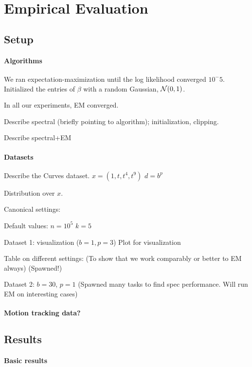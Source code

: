 \section{Empirical Evaluation}
\label{sec:evaluation}

\subsection{Setup}

\paragraph{Algorithms}

We ran expectation-maximization until the log likelihood converged
$10^-5$. Initialized the entries of $\beta$ with a random Gaussian, $\mathcal{N}(0, 1)$.

In all our experiments, EM converged.

Describe spectral (briefly pointing to algorithm);
initialization, clipping.

Describe spectral+EM

\paragraph{Datasets}
Describe the Curves dataset.
$x = (1, t, t^4, t^9)$
$d = b^p$

Distribution over $x$.

Canonical settings:

Default values:
$n = 10^5$
$k = 5$

Dataset 1: visualization ($b = 1, p = 3$) 
Plot for visualization

Table on different settings: 
  (To show that we work comparably or better to EM always)
  (Spawned!)

Dataset 2: $b = 30$, $p = 1$
(Spawned many tasks to find spec performance. Will run EM on interesting cases)


\paragraph{Motion tracking data?}

\subsection{Results}

\paragraph{Basic results}

